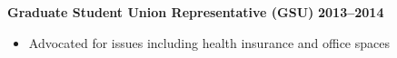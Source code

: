 \documentclass[margin]{res}
\begin{document}
\begin{resume}
{\bf Graduate Student Union Representative (GSU)} \hfill {\bf 2013--2014}
    \begin{itemize}\itemsep -2pt
    \item[] Advocated for issues including health insurance and office spaces
    \end{itemize} %

\end{resume}
\end{document}
